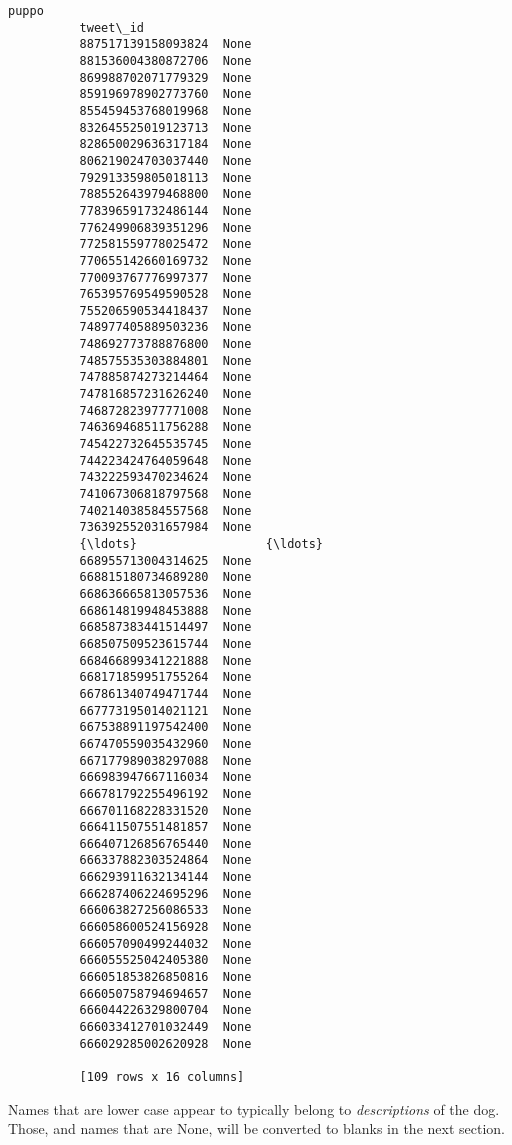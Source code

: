 \documentclass[11pt]{article}
\begin{document}
\begin{Verbatim}[commandchars=\\\{\}]
                             puppo  
          tweet\_id                  
          887517139158093824  None  
          881536004380872706  None  
          869988702071779329  None  
          859196978902773760  None  
          855459453768019968  None  
          832645525019123713  None  
          828650029636317184  None  
          806219024703037440  None  
          792913359805018113  None  
          788552643979468800  None  
          778396591732486144  None  
          776249906839351296  None  
          772581559778025472  None  
          770655142660169732  None  
          770093767776997377  None  
          765395769549590528  None  
          755206590534418437  None  
          748977405889503236  None  
          748692773788876800  None  
          748575535303884801  None  
          747885874273214464  None  
          747816857231626240  None  
          746872823977771008  None  
          746369468511756288  None  
          745422732645535745  None  
          744223424764059648  None  
          743222593470234624  None  
          741067306818797568  None  
          740214038584557568  None  
          736392552031657984  None  
          {\ldots}                  {\ldots}  
          668955713004314625  None  
          668815180734689280  None  
          668636665813057536  None  
          668614819948453888  None  
          668587383441514497  None  
          668507509523615744  None  
          668466899341221888  None  
          668171859951755264  None  
          667861340749471744  None  
          667773195014021121  None  
          667538891197542400  None  
          667470559035432960  None  
          667177989038297088  None  
          666983947667116034  None  
          666781792255496192  None  
          666701168228331520  None  
          666411507551481857  None  
          666407126856765440  None  
          666337882303524864  None  
          666293911632134144  None  
          666287406224695296  None  
          666063827256086533  None  
          666058600524156928  None  
          666057090499244032  None  
          666055525042405380  None  
          666051853826850816  None  
          666050758794694657  None  
          666044226329800704  None  
          666033412701032449  None  
          666029285002620928  None  
          
          [109 rows x 16 columns]
\end{Verbatim}
            
    Names that are lower case appear to typically belong to
\emph{descriptions} of the dog. Those, and names that are None, will be
converted to blanks in the next section.
\end{document}
